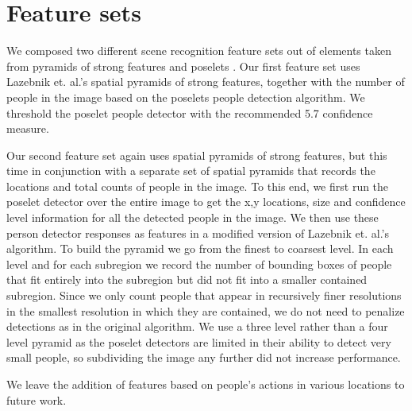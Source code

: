 \documentclass[11pt]{article}
\begin{document}
\section{Feature sets}

We composed two different scene recognition feature sets out of elements taken from pyramids of strong features and poselets \cite{poselets} \cite{beyond_bags}. Our first feature set uses Lazebnik et. al.'s spatial pyramids of strong features, together with the number of people in the image based on the poselets people detection algorithm. We threshold the poselet people detector with the recommended 5.7 confidence measure.

Our second feature set again uses spatial pyramids of strong features, but this time in conjunction with a separate set of spatial pyramids that records the locations and total counts of people in the image. To this end, we first run the poselet detector over the entire image to get the x,y locations, size and confidence level information for all the detected people in the image. We then use these person detector responses as features in a modified version of  Lazebnik et. al.'s algorithm. To build the pyramid we go from the finest to coarsest level. In each level and for each subregion we record the number of bounding boxes of people that fit entirely into the subregion but did not fit into a smaller contained subregion. Since we only count people that appear in recursively finer resolutions in the smallest resolution in which they are contained, we do not need to penalize detections as in the original algorithm. We use a three level rather than a four level pyramid as the poselet detectors are limited in their ability to detect very small people, so subdividing the image any further did not increase performance.

We leave the addition of features based on people's actions in various locations to future work.

\end{document}
